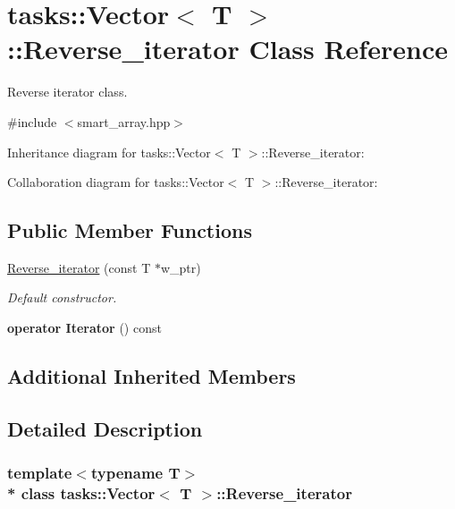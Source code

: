 \hypertarget{classtasks_1_1Vector_1_1Reverse__iterator}{}\section{tasks\+:\+:Vector$<$ T $>$\+:\+:Reverse\+\_\+iterator Class Reference}
\label{classtasks_1_1Vector_1_1Reverse__iterator}


Reverse iterator class.  




{\ttfamily \#include $<$smart\+\_\+array.\+hpp$>$}



Inheritance diagram for tasks\+:\+:Vector$<$ T $>$\+:\+:Reverse\+\_\+iterator\+:


Collaboration diagram for tasks\+:\+:Vector$<$ T $>$\+:\+:Reverse\+\_\+iterator\+:
\subsection*{Public Member Functions}
\begin{DoxyCompactItemize}
\item 
\hyperlink{classtasks_1_1Vector_1_1Reverse__iterator_ae4f55ca6245c18a0e60c6e7b301e26ca}{Reverse\+\_\+iterator} (const T $\ast$w\+\_\+ptr)
\begin{DoxyCompactList}\small\item\em Default constructor. \end{DoxyCompactList}\item 
{\bfseries operator Iterator} () const \hypertarget{classtasks_1_1Vector_1_1Reverse__iterator_a8958651b23160ebe32c85ed4b51fa495}{}\label{classtasks_1_1Vector_1_1Reverse__iterator_a8958651b23160ebe32c85ed4b51fa495}

\end{DoxyCompactItemize}
\subsection*{Additional Inherited Members}


\subsection{Detailed Description}
\subsubsection*{template$<$typename T$>$\\*
class tasks\+::\+Vector$<$ T $>$\+::\+Reverse\+\_\+iterator}

